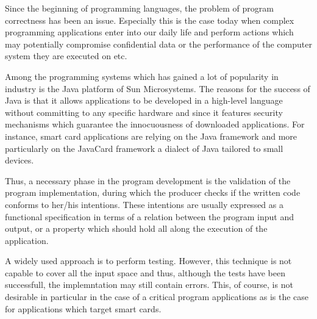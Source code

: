 Since the beginning of programming languages, the problem of program correctness has been an issue. 
Especially this is the case today when complex programming applications  enter into our daily life and perform actions 
which may potentially compromise confidential data or the performance of the computer system they are executed on etc.


Among the programming systems which has gained a lot of popularity in industry is the Java platform of Sun Microsystems. %
 The reasons for the  success of Java is that it allows applications to 
 be developed in a high-level language without committing to any
specific hardware and since it features security mechanisms which
guarantee the innocuousness of downloaded applications. 
For instance, smart card applications are relying on the Java framework and
 more particularly on the JavaCard framework a dialect of Java tailored to small devices. 



Thus, a necessary phase in the program development is the validation of the program implementation, during which 
the producer checks if the written code conforms to her/his intentions. 
These intentions are usually expressed as  a functional specification in terms of a relation between the program
input and output, or a property which  should hold all along the execution of the application. 

A widely used approach is to perform testing. However, this technique is not capable
to cover all the input space and thus, although the tests have been successfull, 
the implemntation may still contain errors. This, of course, is not desirable in particular in the case of a critical 
program applications as is the case for applications which target smart cards. 

